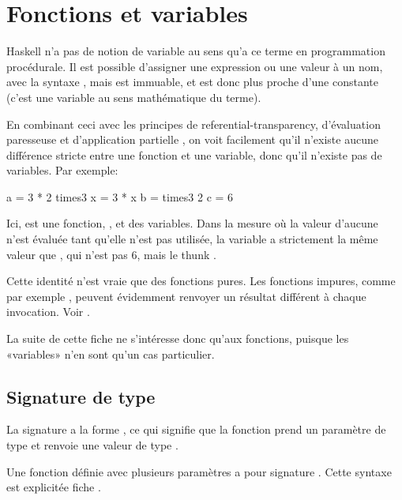 \section{Fonctions et variables}
\label{functions-and-variables}

Haskell n'a pas de notion de variable au sens qu'a ce terme en programmation procédurale. Il est possible d'assigner une expression ou une valeur à un nom, avec la syntaxe , mais  est immuable, et est donc plus proche d'une constante (c'est une variable au sens mathématique du terme).

En combinant ceci avec les principes de \gls{referential-transparency}, d'évaluation paresseuse  et d'application partielle , on voit facilement qu'il n'existe aucune différence stricte entre une fonction et une variable, donc qu'il n'existe pas de variables. Par exemple:

\begin{haskellcode}
a = 3 * 2
times3 x = 3 * x
b = times3 2
c = 6
\end{haskellcode}

Ici,  est une fonction, ,  et  des variables. Dans la mesure où la valeur d'aucune n'est évaluée tant qu'elle n'est pas utilisée, la variable  a strictement la même valeur que , qui n'est pas 6, mais le \gls{thunk} .

\begin{warnbox}
Cette identité n'est vraie que des fonctions pures. Les fonctions impures, comme par exemple , peuvent évidemment renvoyer un résultat différent à chaque invocation. Voir .
\end{warnbox}

La suite de cette fiche ne s'intéresse donc qu'aux fonctions, puisque les «variables» n'en sont qu'un cas particulier.

\subsection{Signature de type}
\label{type-signatures}

La signature a la forme , ce qui signifie que la fonction prend un paramètre de type  et renvoie une valeur de type .

Une fonction définie avec plusieurs paramètres a pour signature . Cette syntaxe est explicitée fiche .

